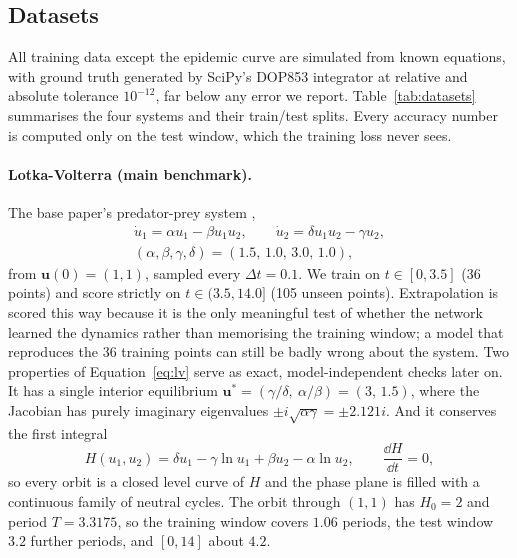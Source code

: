 \subsection{Datasets}
\label{sec:datasets}

All training data except the epidemic curve are simulated from known
equations, with ground truth generated by SciPy's \cite{virtanen2020scipy}
DOP853 integrator at relative and absolute tolerance $10^{-12}$, far below
any error we report. Table~\ref{tab:datasets} summarises the four systems
and their train/test splits. Every accuracy number is computed only on the
test window, which the training loss never sees.

\paragraph{Lotka-Volterra (main benchmark).} The base paper's predator-prey
system \cite{koenig2024kanode},
\begin{gather}
\dot u_1 = \alpha u_1 - \beta u_1 u_2, \qquad \dot u_2 = \delta u_1 u_2 - \gamma u_2,
\nonumber\\
(\alpha,\beta,\gamma,\delta) = (1.5,\,1.0,\,3.0,\,1.0),
\label{eq:lv}
\end{gather}
from $\mathbf{u}(0)=(1,1)$, sampled every $\Delta t=0.1$. We train on
$t\in[0,3.5]$ (36 points) and score strictly on $t\in(3.5,14.0]$ (105
unseen points). Extrapolation is scored this way because it is the only
meaningful test of whether the network learned the dynamics rather than
memorising the training window; a model that reproduces the 36 training
points can still be badly wrong about the system. Two properties of
Equation~\ref{eq:lv} serve as exact, model-independent checks later on. It
has a single interior equilibrium
$\mathbf{u}^\ast=(\gamma/\delta,\ \alpha/\beta)=(3,\,1.5)$, where the
Jacobian has purely imaginary eigenvalues $\pm i\sqrt{\alpha\gamma}=\pm2.121i$.
And it conserves the first integral
\begin{equation}
H(u_1,u_2)=\delta u_1-\gamma\ln u_1+\beta u_2-\alpha\ln u_2,
\qquad \frac{\dd H}{\dd t}=0,
\label{eq:lv-invariant}
\end{equation}
so every orbit is a closed level curve of $H$ and the phase plane is filled
with a continuous family of neutral cycles. The orbit through $(1,1)$ has
$H_0=2$ and period $T=3.3175$, so the training window covers $1.06$
periods, the test window $3.2$ further periods, and $[0,14]$ about $4.2$.

